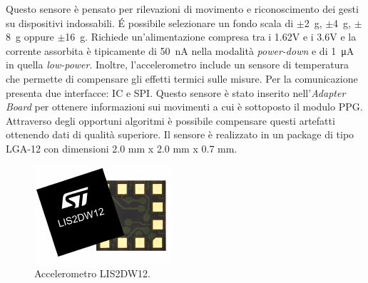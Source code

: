 Questo sensore è pensato per rilevazioni di movimento e riconoscimento dei gesti su dispositivi indossabili. \'E possibile selezionare un fondo scala di $\pm$\SI{2}{\gram}, $\pm$\SI{4}{\gram}, $\pm$\SI{8}{\gram} oppure $\pm$\SI{16}{\gram}. Richiede un'alimentazione compresa tra i 1.62V e i 3.6V e la corrente assorbita è tipicamente di \SI{50}{\nano\ampere} nella modalità \textit{power-down} e di \SI{1}{\micro\ampere} in quella \textit{low-power}. Inoltre, l'accelerometro include un sensore di temperatura che permette di compensare gli effetti termici sulle misure. Per la comunicazione presenta due interfacce: IC e SPI. Questo sensore è stato inserito nell'\textit{Adapter Board} per ottenere informazioni sui movimenti a cui è sottoposto il modulo PPG. Attraverso degli opportuni algoritmi è possibile compensare questi artefatti ottenendo dati di qualità superiore. Il sensore è realizzato in un package di tipo LGA-12 con dimensioni 2.0 mm x 2.0 mm x 0.7 mm.
\begin{figure}[h]
	\centering
	\includegraphics[width=0.3\linewidth]{ImageFiles/Hardware/ImmagineLIS2DW12}
	\caption{Accelerometro LIS2DW12.}
	\label{fig:ImmagineLIS2DW12}
\end{figure}

